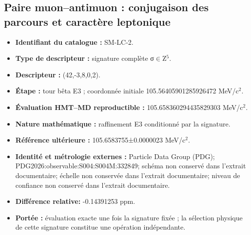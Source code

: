 \subsection{Paire muon–antimuon : conjugaison des parcours et caractère leptonique}
\begin{itemize}
\item \textbf{Identifiant du catalogue :} SM-LC-2.
\item \textbf{Type de descripteur :} signature complète σ\(\in\)Z\({}^{5}\).
\item \textbf{Descripteur :} (42,-3,8,0,2).
\item \textbf{Étape :} tour bêta E3 ; coordonnée initiale 105.564059\allowbreak{}012859\allowbreak{}26472 MeV/c\({}^{2}\).
\item \textbf{Évaluation HMT--MD reproductible :} 105.658360\allowbreak{}294435\allowbreak{}829303 MeV/c\({}^{2}\).
\item \textbf{Nature mathématique :} raffinement E3 conditionné par la signature.
\item \textbf{Référence ultérieure :} 105.658375\allowbreak{}5±\allowbreak{}0.000002\allowbreak{}3 MeV/c\({}^{2}\).
\item \textbf{Identité et métrologie externes :} Particle Data Group (PDG); PDG2026:\allowbreak{}observable:\allowbreak{}S004:\allowbreak{}S004M:\allowbreak{}332849; schéma non conservé dans l’extrait documentaire; échelle non conservée dans l’extrait documentaire; niveau de confiance non conservé dans l’extrait documentaire.
\item \textbf{Différence relative:} -0.143912\allowbreak{}53 ppm.
\item \textbf{Portée :} évaluation exacte une fois la signature fixée ; la sélection physique de cette signature constitue une opération indépendante.
\end{itemize}
